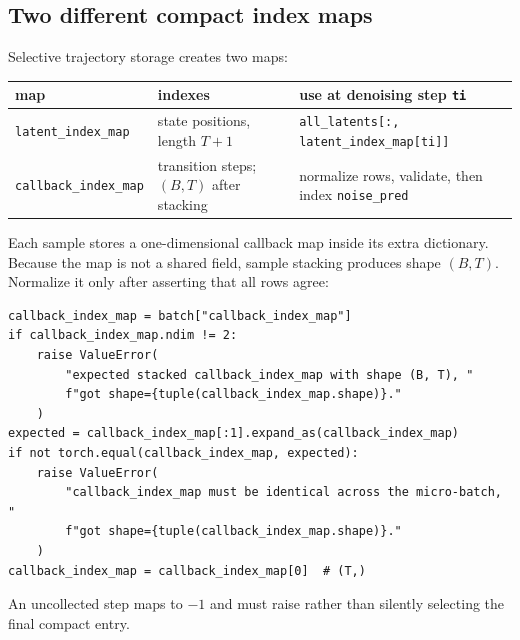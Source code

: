 \documentclass[11pt,a4paper]{article}
\theoremstyle{plain}
\theoremstyle{definition}
\begin{document}
\subsection{Two different compact index maps}

Selective trajectory storage creates two maps:
\begin{center}
\begin{tabular}{@{}
  >{\raggedright\arraybackslash}p{}
  >{\raggedright\arraybackslash}p{}
  >{\raggedright\arraybackslash}p{}
@{}}
\toprule
map & indexes & use at denoising step \texttt{ti}\\
\midrule
\texttt{latent\_index\_map} & state positions, length $T+1$
& \texttt{all\_latents[:, latent\_index\_map[ti]]}\\
\texttt{callback\_index\_map} & transition steps; $(B,T)$ after stacking
& normalize rows, validate, then index \texttt{noise\_pred}\\
\bottomrule
\end{tabular}
\end{center}
Each sample stores a one-dimensional callback map inside its extra dictionary.  Because the map
is not a shared field, sample stacking produces shape $(B,T)$.  Normalize it only after asserting
that all rows agree:
\begin{lstlisting}[style=python,caption={Normalize the stacked callback map safely.}]
callback_index_map = batch["callback_index_map"]
if callback_index_map.ndim != 2:
    raise ValueError(
        "expected stacked callback_index_map with shape (B, T), "
        f"got shape={tuple(callback_index_map.shape)}."
    )
expected = callback_index_map[:1].expand_as(callback_index_map)
if not torch.equal(callback_index_map, expected):
    raise ValueError(
        "callback_index_map must be identical across the micro-batch, "
        f"got shape={tuple(callback_index_map.shape)}."
    )
callback_index_map = callback_index_map[0]  # (T,)
\end{lstlisting}
An uncollected step maps to $-1$ and must raise rather than silently selecting the final compact
entry.
\end{document}
